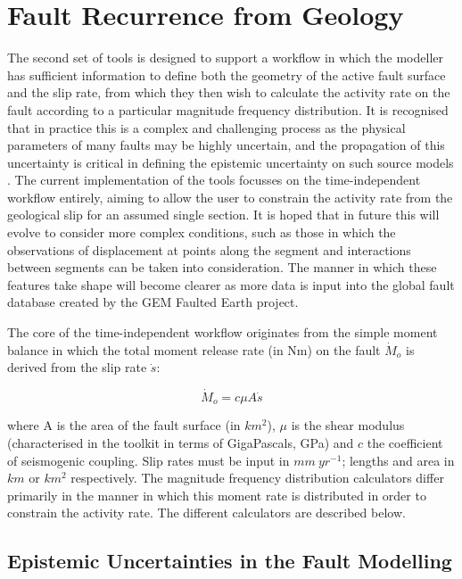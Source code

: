 \section{Fault Recurrence from Geology}

The second set of tools is designed to support a workflow in which the modeller has sufficient information to define both the geometry of the active fault surface and the slip rate, from which they then wish to calculate the activity rate on the fault according to a particular magnitude frequency distribution. It is recognised that in practice this is a complex and challenging process as the physical parameters of many faults may be highly uncertain, and the propagation of this uncertainty is critical in defining the epistemic uncertainty on such source models \parencite{Peruzza_etal2010}. The current implementation of the tools focusses on the time-independent workflow entirely, aiming to allow the user to constrain the activity rate from the geological slip for an assumed single section. It is hoped that in future this will evolve to consider more complex conditions, such as those in which the observations of displacement at points along the segment and interactions between segments can be taken into consideration. The manner in which these features take shape will become clearer as more data is input into the global fault database created by the GEM Faulted Earth project.

The core of the time-independent workflow originates from the simple moment balance 
in which the total moment release rate (in Nm) on the fault $\dot{M}_o$ is derived from the slip rate $\dot{s}$\parencite{AndersonLuco1983, Bungum2007}: 

\begin{equation}
\dot{M}_o = c \mu A \dot{s}
\end{equation}

where A is the area of the fault surface (in $km^2$), $\mu$ is the shear modulus (characterised in the toolkit in terms of GigaPascals, GPa) and $c$ the coefficient of seismogenic coupling. Slip rates must be input in $mm\ yr^{-1}$; lengths and area in $km$ or $km^2$ respectively. The magnitude frequency distribution calculators differ primarily in the manner in which this moment rate is distributed in order to constrain the activity rate. The different calculators are described below.

\subsection{Epistemic Uncertainties in the Fault Modelling}

